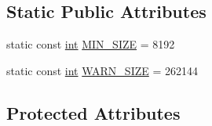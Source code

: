 \subsection*{Static Public Attributes}
\begin{DoxyCompactItemize}
\item 
static const \hyperlink{sphinxexpr_8cpp_a4a26e8f9cb8b736e0c4cbf4d16de985e}{int} \hyperlink{structCSphBin_ae7e93ba8f3286a49b1c9c2e18cd53b8b}{M\-I\-N\-\_\-\-S\-I\-Z\-E} = 8192
\item 
static const \hyperlink{sphinxexpr_8cpp_a4a26e8f9cb8b736e0c4cbf4d16de985e}{int} \hyperlink{structCSphBin_ae687edd7f3d0ce8cfe4090134d4517a9}{W\-A\-R\-N\-\_\-\-S\-I\-Z\-E} = 262144
\end{DoxyCompactItemize}
\subsection*{Protected Attributes}
